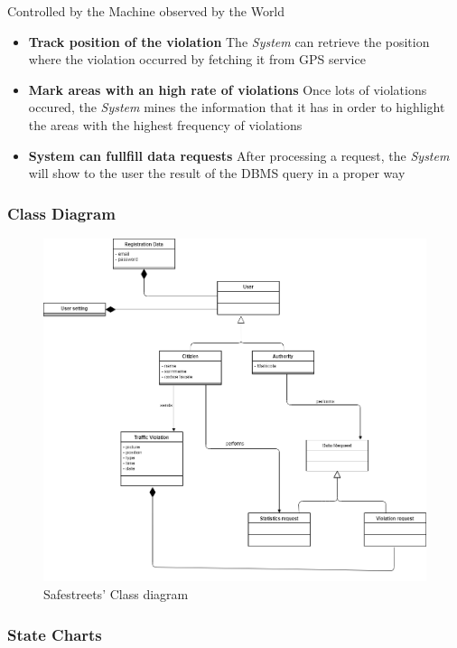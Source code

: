 \documentclass{article}
\begin{document}
Controlled by the Machine observed by the World
\begin{itemize}
    \item\textbf{Track position of the violation}
    The \textit{System} can retrieve the position where the violation occurred by fetching it from GPS service
    \item\textbf{Mark areas with an high rate of violations}
    Once lots of violations occured, the \textit{System} mines the information that it has in order to highlight the areas with the highest frequency of violations
    \item\textbf{System can fullfill data requests}
    After processing a request, the \textit{System} will show to the user the result of the DBMS query in a proper way

\end{itemize}

\subsubsection{Class Diagram} 

\begin{figure}[h!]
    \centering
    \includegraphics[scale=0.3]{img/class_diagram.png}
    \caption{Safestreets' Class diagram}
\end{figure}
\clearpage
\subsubsection{State Charts} 
\end{document}
